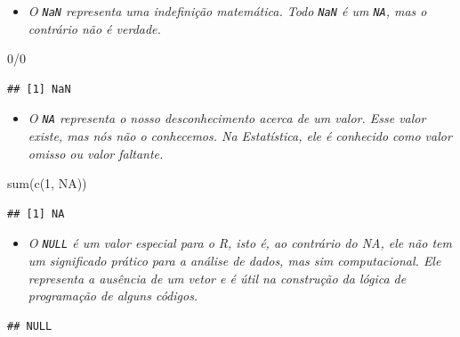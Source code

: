 \documentclass[
]{book}
\newenvironment{Shaded}{\begin{snugshade}}{\end{snugshade}}
\newcommand{\ConstantTok}[1]{\textcolor[rgb]{0.00,0.00,0.00}{#1}}
\newcommand{\DecValTok}[1]{\textcolor[rgb]{0.00,0.00,0.81}{#1}}
\newcommand{\FunctionTok}[1]{\textcolor[rgb]{0.00,0.00,0.00}{#1}}
\newcommand{\NormalTok}[1]{#1}
\newcommand{\SpecialCharTok}[1]{\textcolor[rgb]{0.00,0.00,0.00}{#1}}
\providecommand{\tightlist}{%
  \setlength{\itemsep}{0pt}\setlength{\parskip}{0pt}}
\begin{document}
\begin{itemize}
\tightlist
\item
  \emph{O \texttt{NaN} representa uma indefinição matemática. Todo \texttt{NaN} é um \texttt{NA}, mas o contrário não é verdade.}
\end{itemize}

\begin{Shaded}
\begin{Highlighting}[]
\DecValTok{0}\SpecialCharTok{/}\DecValTok{0}
\end{Highlighting}
\end{Shaded}

\begin{verbatim}
## [1] NaN
\end{verbatim}

\begin{itemize}
\tightlist
\item
  \emph{O \texttt{NA} representa o nosso desconhecimento acerca de um valor. Esse valor existe, mas nós não o conhecemos. Na Estatística, ele é conhecido como valor omisso ou valor faltante.}
\end{itemize}

\begin{Shaded}
\begin{Highlighting}[]
\FunctionTok{sum}\NormalTok{(}\FunctionTok{c}\NormalTok{(}\DecValTok{1}\NormalTok{, }\ConstantTok{NA}\NormalTok{))}
\end{Highlighting}
\end{Shaded}

\begin{verbatim}
## [1] NA
\end{verbatim}

\begin{itemize}
\tightlist
\item
  \emph{O \texttt{NULL} é um valor especial para o R, isto é, ao contrário do NA, ele não tem um significado prático para a análise de dados, mas sim computacional. Ele representa a ausência de um vetor e é útil na construção da lógica de programação de alguns códigos.}
\end{itemize}

\begin{Shaded}
\end{Shaded}

\begin{verbatim}
## NULL
\end{verbatim}
\end{document}
